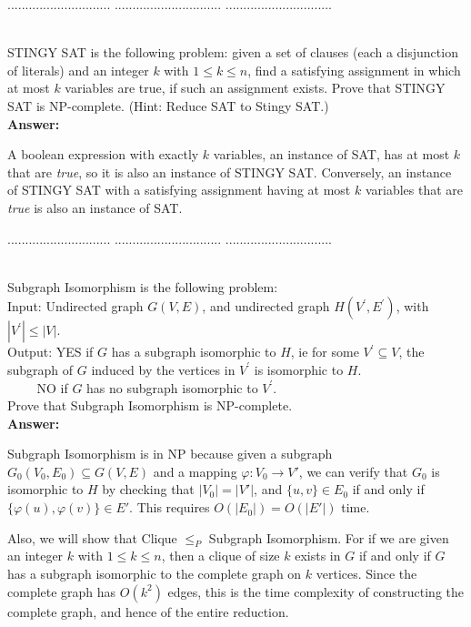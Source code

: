 \documentclass[a4paper,11pt]{article}
\begin{document}
\pagebreak

 $.............................$
 $..............................$
          $..............................$\\

\bigskip

\\
STINGY SAT is the following problem: given a set of clauses (each a disjunction of literals) and
an integer $k$ with $1 \leq k \leq n$, find a satisfying assignment in which at most $k$ variables are true, if such an
assignment exists. Prove that STINGY SAT is NP-complete. (Hint: Reduce SAT to Stingy SAT.)\\
{\bf Answer:} \par
A boolean expression with exactly $k$ variables, an instance of SAT, has at most $k$ that are \textit{true}, so it is also an instance of STINGY SAT. Conversely, an instance of STINGY SAT with a satisfying assignment having at most $k$ variables that are \textit{true} is also an instance of SAT.

\pagebreak

 $.............................$
 $..............................$
          $..............................$\\

\bigskip

\\
Subgraph Isomorphism is the following problem:\\
Input: Undirected graph $G(V,E)$, and undirected graph $H(V^\prime , E^\prime)$, with $|V^\prime | \leq |V|$.\\
Output: YES if $G$ has a subgraph isomorphic to $H$, ie for some $V^\prime \subseteq V$, the subgraph of $G$ induced 
by the vertices in $V^\prime$ is isomorphic to $H$.\\
$~~~~~~~~~$ NO if $G$ has no subgraph isomorphic to $V^\prime$. \\
Prove that Subgraph Isomorphism is NP-complete. \\
{\bf Answer:} \par
Subgraph Isomorphism is in NP because given a subgraph $G_0(V_0, E_0) \subseteq G(V, E)$ and a mapping $\varphi : V_0 \to V'$, we can verify that $G_0$ is isomorphic to $H$ by checking that $|V_0| = |V'|$, and $\{ u, v \} \in E_0$ if and only if $\{ \varphi(u), \varphi(v) \} \in E'$. This requires $O(|E_0|) = O(|E'|)$ time. \par
Also, we will show that Clique $\leq_P$ Subgraph Isomorphism. For if we are given an integer $k$ with $1 \leq k \leq n$, then a clique of size $k$ exists in $G$ if and only if $G$ has a subgraph isomorphic to the complete graph on $k$ vertices. Since the complete graph has $O(k^2)$ edges, this is the time complexity of constructing the complete graph, and hence of the entire reduction.
\end{document}
